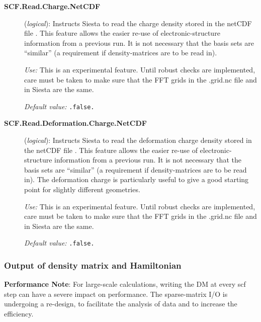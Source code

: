 \begin{description}
  \item[\textbf{SCF.Read.Charge.NetCDF}] (\textit{logical}):
   Instructs Siesta to read
  the charge density stored in the netCDF file
  . This feature allows the easier re-use of
  electronic-structure information from a previous run. It is not
  necessary that the basis sets are ``similar'' (a requirement if
  density-matrices are to be read in).

\textit{Use:} This is an experimental feature.  Until robust checks are
implemented, care must be taken to make sure that the FFT grids in the
.grid.nc file and in Siesta are the same.

\textit{Default value:} \texttt{.false.}

\item[\textbf{SCF.Read.Deformation.Charge.NetCDF}] (\textit{logical}):
  Instructs Siesta to read the
deformation charge density stored in the netCDF file
. This feature allows the easier re-use of
electronic-structure information from a previous run. It is not
necessary that the basis sets are ``similar'' (a requirement if
density-matrices are to be read in). The deformation charge is
particularly useful to give a good starting point for slightly
different geometries.

\textit{Use:} This is an experimental feature.  Until robust checks are
implemented, care must be taken to make sure that the FFT grids in the
.grid.nc file and in Siesta are the same.

\textit{Default value:} \texttt{.false.}

\end{description}


\subsubsection{Output of density matrix and Hamiltonian}

\textbf{Performance Note}: For large-scale calculations, writing the DM
at every scf step can have a severe impact on performance. 
The sparse-matrix I/O is undergoing a re-design, to facilitate the
analysis of data and to increase the efficiency. 

